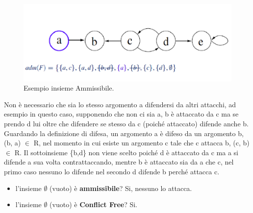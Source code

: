 \begin{figure}[H]
    \centering
    \includegraphics[width=12cm, keepaspectratio]{img/Cap6/ammissibile.png}
    \caption{Esempio insieme Ammissibile.}
\end{figure}

Non è necessario che sia lo stesso argomento a difendersi da altri attacchi, ad
esempio in questo caso, supponendo che non ci sia a, b è attaccato da c ma se
prendo d lui oltre che difendere se stesso da c (poiché attaccato) difende anche
b. Guardando la definizione di difesa, un argomento a è difeso da un argomento
b, (b, a) $\in$ R, nel momento in cui esiste un argomento c tale che c attacca
b, (c, b) $\in$ R. Il sottoinsieme \{b,d\} non viene scelto poiché d è attaccato
da c ma a si difende a sua volta contrattaccando, mentre b è attaccato sia da a
che c, nel primo caso nessuno lo difende nel secondo d difende b perché attacca
c.
\begin{itemize}
    \item l'insieme $\emptyset$ (vuoto) è \textbf{ammissibile}? Si, nessuno lo attacca.
    \item l'insieme $\emptyset$ (vuoto) è \textbf{Conflict Free}? Si.
\end{itemize}

